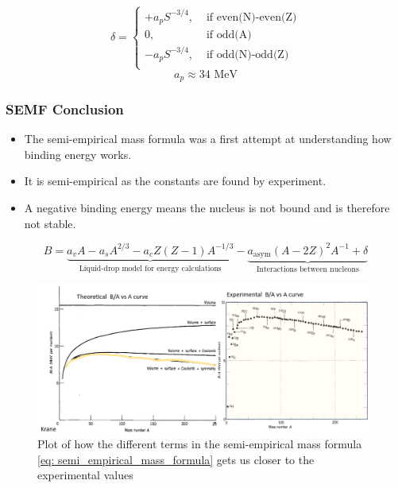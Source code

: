 \begin{itemize}
    \begin{equation}
    δ =  \begin{cases}
        +a_pS^{-3 / 4}, &\text{ if even(N)-even(Z)}\\
        0, &\text{ if odd(A)}\\
        -a_pS^{-3 / 4}, &\text{ if odd(N)-odd(Z)}\\
    \end{cases} 
    \end{equation}
    \begin{equation}
    a_p ≈ 34 \text{ MeV}
    \end{equation}
\end{itemize}
\subsubsection{SEMF Conclusion}
\begin{itemize}
    \item The semi-empirical mass formula was a first attempt at understanding how binding energy works. 
    \item It is semi-empirical as the constants are found by experiment. 
    \item A negative binding energy means the nucleus is not bound and is therefore not stable.
\end{itemize}
\begin{equation}
B = \underbrace{a_vA - a_sA^{2 / 3} - a_cZ(Z-1)A^{-1 / 3}}_{\text{Liquid-drop model for energy calculations}} - \underbrace{a_{\text{asym}}(A-2Z)^2A^{-1} + δ}_{\text{Interactions between nucleons}}
\end{equation}
\begin{figure}[h!]
\centering
\includegraphics[width = \textwidth]{SEMF_term_addition.png}
\caption{Plot of how the different terms in the semi-empirical mass formula \cref{eq: semi_empirical_mass_formula} gets us closer to the experimental values}
\label{fig: SEMF_term_addition}
\end{figure}



